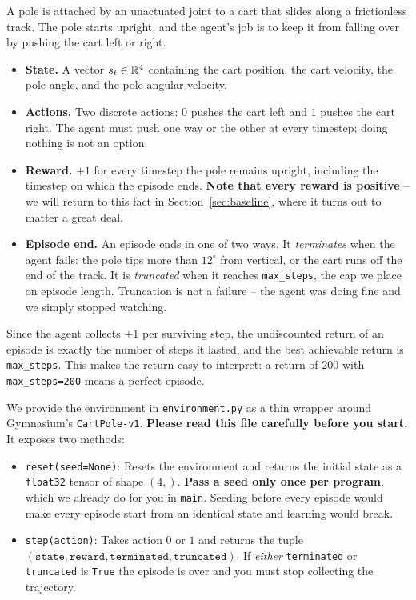 A pole is attached by an unactuated joint to a cart that slides along a
frictionless track. The pole starts upright, and the agent's job is to keep it
from falling over by pushing the cart left or right.

\begin{itemize}
    \item \textbf{State.} A vector $s_t \in \mathbb{R}^4$ containing the cart position,
    the cart velocity, the pole angle, and the pole angular velocity.
    \item \textbf{Actions.} Two discrete actions: $0$ pushes the cart left and
    $1$ pushes the cart right. The agent must push one way or the other at
    every timestep; doing nothing is not an option.
    \item \textbf{Reward.} $+1$ for every timestep the pole remains upright,
    including the timestep on which the episode ends. \textbf{Note that every
    reward is positive} -- we will return to this fact in
    Section~\ref{sec:baseline}, where it turns out to matter a great deal.
    \item \textbf{Episode end.} An episode ends in one of two ways. It
    \emph{terminates} when the agent fails: the pole tips more than
    $12^{\circ}$ from vertical, or the cart runs off the end of the track. It is
    \emph{truncated} when it reaches \verb|max_steps|, the cap we place on
    episode length. Truncation is not a failure -- the agent was doing fine and
    we simply stopped watching.
\end{itemize}

Since the agent collects $+1$ per surviving step, the undiscounted return of an
episode is exactly the number of steps it lasted, and the best achievable return
is \verb|max_steps|. This makes the return easy to interpret: a return of $200$
with \verb|max_steps=200| means a perfect episode.

We provide the environment in \texttt{environment.py} as a thin wrapper around
Gymnasium's \verb|CartPole-v1|. \textbf{Please read this file carefully before
you start.} It exposes two methods:

\begin{itemize}
    \item \verb|reset(seed=None)|: Resets the environment and returns the
    initial state as a \verb|float32| tensor of shape $(4,)$. \textbf{Pass a seed
    only once per program}, which we already do for you in \verb|main|. Seeding
    before every episode would make every episode start from an identical state
    and learning would break.

    \item \verb|step(action)|: Takes action $0$ or $1$ and returns the tuple
    $(\texttt{state}, \texttt{reward}, \texttt{terminated}, \texttt{truncated})$.
    If \emph{either} \verb|terminated| or \verb|truncated| is \verb|True| the
    episode is over and you must stop collecting the trajectory.
\end{itemize}

